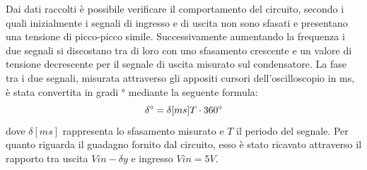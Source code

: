 Dai dati raccolti è possibile verificare il comportamento del circuito, secondo i quali inizialmente i segnali di ingresso e di uscita non sono sfasati e presentano una tensione di picco-picco simile. Successivamente aumentando la frequenza i due segnali si discostano tra di loro con uno sfasamento crescente e un valore di tensione decrescente per il segnale di uscita misurato sul condensatore. La fase tra i due segnali, misurata attraverso gli appositi cursori dell’oscilloscopio in ms, è stata convertita in gradi ° mediante la seguente formula:
$$\delta \degree= \delta [ms]T \cdot 360\degree$$
dove $\delta [ms]$ rappresenta lo sfasamento misurato e $T$ il periodo del segnale.
Per quanto riguarda il guadagno fornito dal circuito, esso è stato ricavato attraverso il rapporto tra uscita $Vin - \delta y$ e ingresso $Vin = 5 V$. 

\begin{figure}[h]
\end{figure}


